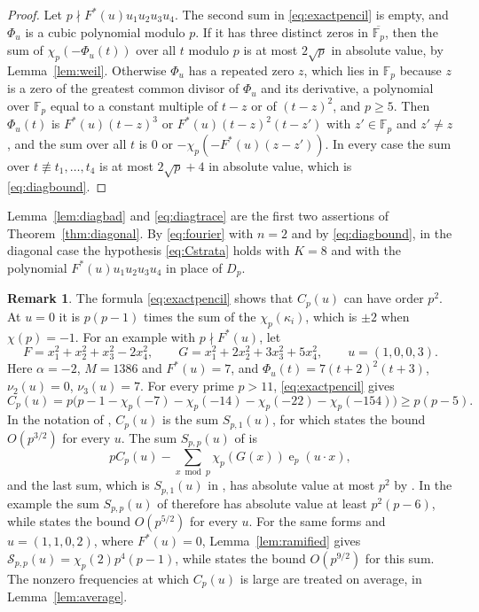 \documentclass[11pt]{amsart}
\numberwithin{equation}{section}
\numberwithin{figure}{section}
\theoremstyle{definition}
\newtheorem{remark}{Remark}[section]
\newcommand{\e}{\operatorname{e}}
\newcommand{\Fp}{\mathbb F_p}
\begin{document}
\begin{proof}
Let $p\nmid F^*(u)u_1u_2u_3u_4$. The second sum in
\eqref{eq:exactpencil} is empty, and $\Phi_u$ is a cubic polynomial
modulo $p$. If it has three distinct zeros in $\overline{\Fp}$, then
the sum of $\chi_p(-\Phi_u(t))$ over all $t$ modulo $p$ is at most
$2\sqrt p$ in absolute value, by Lemma~\ref{lem:weil}. Otherwise
$\Phi_u$ has a repeated zero $z$, which lies in $\Fp$ because $z$ is
a zero of the greatest common divisor of $\Phi_u$ and its
derivative, a polynomial over $\Fp$ equal to a constant multiple of
$t-z$ or of $(t-z)^2$, and $p\ge5$. Then $\Phi_u(t)$ is
$F^*(u)(t-z)^3$ or $F^*(u)(t-z)^2(t-z')$ with $z'\in\Fp$ and
$z'\ne z$, and the sum over all $t$ is $0$ or
$-\chi_p(-F^*(u)(z-z'))$. In every case the sum over
$t\not\equiv t_1,\ldots,t_4$ is at most $2\sqrt p+4$ in absolute
value, which is \eqref{eq:diagbound}.
\end{proof}

Lemma~\ref{lem:diagbad} and \eqref{eq:diagtrace} are the first two
assertions of Theorem~\ref{thm:diagonal}. By \eqref{eq:fourier} with
$n=2$ and by \eqref{eq:diagbound}, in the diagonal case the hypothesis
\eqref{eq:Cstrata} holds with $K=8$ and with the polynomial
$F^*(u)u_1u_2u_3u_4$ in place of $D_p$.

\begin{remark}\label{rem:literature}
The formula \eqref{eq:exactpencil} shows that $C_p(u)$ can have order
$p^2$. At $u=0$ it is $p(p-1)$ times the sum of the
$\chi_p(\kappa_i)$, which is $\pm2$ when $\chi(p)=-1$. For an example
with $p\nmid F^*(u)$, let
\[
 F=x_1^2+x_2^2+x_3^2-2x_4^2,\qquad
 G=x_1^2+2x_2^2+3x_3^2+5x_4^2,\qquad u=(1,0,0,3).
\]
Here $\alpha=-2$, $M=1386$ and $F^*(u)=7$, and
$\Phi_u(t)=7(t+2)^2(t+3)$, $\nu_2(u)=0$, $\nu_3(u)=7$. For every
prime $p>11$, \eqref{eq:exactpencil} gives
\[
 C_p(u)=p\big(p-1-\chi_p(-7)-\chi_p(-14)-\chi_p(-22)-\chi_p(-154)\big)
 \ge p(p-5).
\]
In the notation of \cite{M}, $C_p(u)$ is the sum $S_{p,1}(u)$, for
which \cite[Lemma~5.3]{M} states the bound $O(p^{3/2})$ for every
$u$. The sum $S_{p,p}(u)$ of \cite{IM} is
\[
 pC_p(u)-\sum_{x\bmod p}\chi_p(G(x))\e_p(u\cdot x),
\]
and the last sum, which is $S_{p,1}(u)$ in \cite{IM}, has absolute
value at most $p^2$ by \cite[Lemma~4.3]{IM}. In the example the sum
$S_{p,p}(u)$ of \cite{IM} therefore has absolute value at least
$p^2(p-6)$, while \cite[Lemma~4.6]{IM} states the bound
$O(p^{5/2})$ for every $u$. For the same forms and $u=(1,1,0,2)$,
where $F^*(u)=0$, Lemma~\ref{lem:ramified} gives
$\mathcal S_{p,p}(u)=\chi_p(2)p^4(p-1)$, while
\cite[Lemma~5.4]{M} states the bound $O(p^{9/2})$ for this sum. The
nonzero frequencies at which $C_p(u)$ is large are treated on
average, in Lemma~\ref{lem:average}.
\end{remark}
\end{document}

